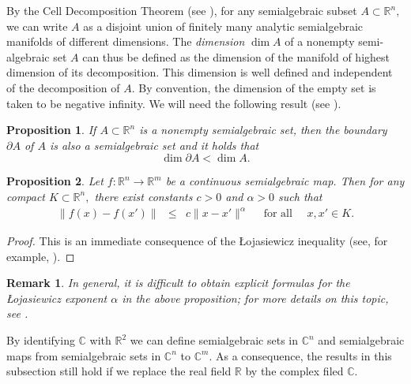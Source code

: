 \documentclass[10pt,reqno]{amsart}
\theoremstyle{break-italic}
\theoremstyle{break-italic}
\theoremstyle{break-italic}
\theoremstyle{break-italic}
\theoremstyle{break-italic}
\theoremstyle{break-italic}
\theoremstyle{break-italic}
\theoremstyle{break-italic}
\theoremstyle{break-roman}
\newtheorem{remark}[satz]{Remark}
\theoremstyle{standard}
\theoremstyle{varthm-roman}
\theoremstyle{varthm-italic}
\theoremstyle{varthm-roman-break}
\theoremstyle{varthm-italic-break}
\theoremstyle{varthm-roman-no-punctuation}
\theoremstyle{varthm-italic-no-punctuation}
\numberwithin{equation}{section}
\newtheorem{proposition}{Proposition}[section]
\begin{document}
By the Cell Decomposition Theorem (see \cite{Bochnak1998}), for any semialgebraic subset $A \subset \mathbb{R}^n,$ we can write $A$ as a disjoint union of finitely many analytic semialgebraic manifolds of different dimensions.  The {\em dimension} $\dim A$ of a nonempty semi-algebraic set $A$ can thus be defined as the dimension of the manifold of highest dimension of its decomposition. This dimension is well defined and independent of the decomposition of $A.$ By convention, the dimension of the empty set is taken to be negative infinity. We will need the following result (see \cite{Bochnak1998}).

\begin{proposition} \label{DimensionProposition}
If $A \subset \mathbb{R}^n$ is a nonempty semialgebraic set, then the boundary $\partial {A}$ of $A$ is also a semialgebraic set and it holds that
$$\dim \partial {A} < \dim A.$$
\end{proposition}

\begin{proposition}\label{LojasiewiczInequality}
Let $f \colon \mathbb{R}^n \rightarrow \mathbb{R}^m$ be a continuous semialgebraic map. Then for any compact $K \subset \mathbb{R}^n,$ there exist constants $c > 0$ and $\alpha > 0$ such that
\begin{eqnarray*}
\| f(x) - f(x') \| & \le & c \|x - x'\|^\alpha \quad \textrm{ for all } \quad x, x' \in K.
\end{eqnarray*}
\end{proposition}

\begin{proof}
This is an immediate consequence of the {\L}ojasiewicz inequality (see, for example, \cite[Theorem~1.14]{HP2017}).
\end{proof}

\begin{remark}{\rm
In general, it is difficult to obtain explicit formulas for the \L ojasiewicz exponent $\alpha$ in the above proposition; for more details on this topic, see \cite{Dinh2016, Dinh2017, Kurdyka2014, Pham2012}.
}\end{remark}

  By identifying $\mathbb{C}$ with $\mathbb{R}^2$ we can define semialgebraic sets in $\mathbb{C}^n$ and semialgebraic maps from
semialgebraic sets in $\mathbb{C}^n$ to $\mathbb{C}^m.$ As a consequence, the results in this subsection still hold if we replace the real field $\mathbb{R}$ by the complex filed $\mathbb{C}.$
\end{document}
